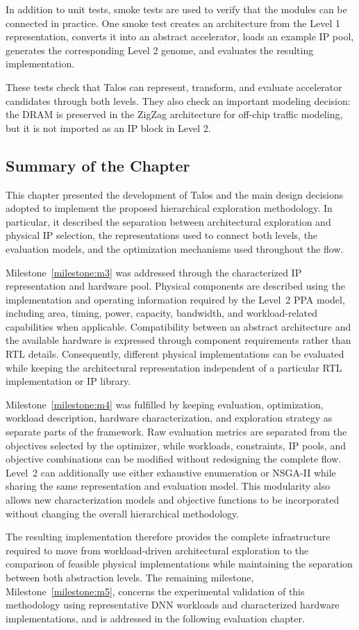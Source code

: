 In addition to unit tests, smoke tests are used to verify that the
modules can be connected in practice. One smoke test creates an
architecture from the Level 1 representation, converts it into an
abstract accelerator, loads an example IP pool, generates the
corresponding Level 2 genome, and evaluates the resulting
implementation.

These tests check that Talos can represent, transform, and evaluate
accelerator candidates through both levels. They also check an
important modeling decision: the DRAM is preserved in the ZigZag
architecture for off-chip traffic modeling, but it is not imported
as an IP block in Level 2.

\subsection{Summary of the Chapter}

This chapter presented the development of Talos and the main design
decisions adopted to implement the proposed hierarchical exploration
methodology. In particular, it described the separation between
architectural exploration and physical IP selection, the
representations used to connect both levels, the evaluation models,
and the optimization mechanisms used throughout the flow.

Milestone~\ref{milestone:m3} was addressed through the characterized
IP representation and hardware pool. Physical components are described
using the implementation and operating information required by the
Level~2 PPA model, including area, timing, power, capacity, bandwidth,
and workload-related capabilities when applicable. Compatibility
between an abstract architecture and the available hardware is
expressed through component requirements rather than RTL details.
Consequently, different physical implementations can be evaluated
while keeping the architectural representation independent of a
particular RTL implementation or IP library.

Milestone~\ref{milestone:m4} was fulfilled by keeping evaluation,
optimization, workload description, hardware characterization, and
exploration strategy as separate parts of the framework. Raw
evaluation metrics are separated from the objectives selected by the
optimizer, while workloads, constraints, IP pools, and objective
combinations can be modified without redesigning the complete flow.
Level~2 can additionally use either exhaustive enumeration or NSGA-II
while sharing the same representation and evaluation model. This
modularity also allows new characterization models and objective
functions to be incorporated without changing the overall
hierarchical methodology.

The resulting implementation therefore provides the complete
infrastructure required to move from workload-driven architectural
exploration to the comparison of feasible physical implementations
while maintaining the separation between both abstraction levels.
The remaining milestone, Milestone~\ref{milestone:m5}, concerns the
experimental validation of this methodology using representative DNN
workloads and characterized hardware implementations, and is addressed
in the following evaluation chapter.

%

